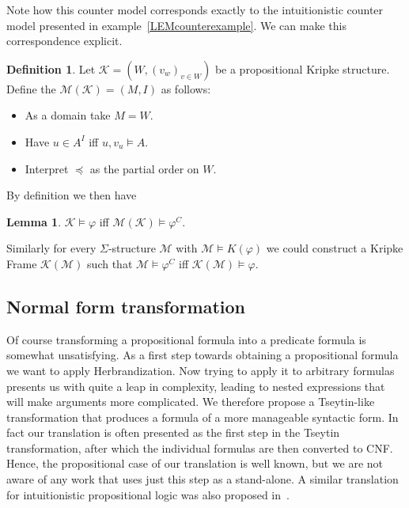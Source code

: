 \documentclass[a4paper,11pt]{report}
\theoremstyle{definition}
\theoremstyle{definition}
\theoremstyle{definition}
\newtheorem{lemma}[theorem]{Lemma}
\theoremstyle{definition}
\theoremstyle{definition}
\newtheorem{definition}[theorem]{Definition}
\theoremstyle{definition}
\theoremstyle{definition}
\begin{document}
	Note how this counter model corresponds exactly to the intuitionistic counter model presented in example~\ref{LEMcounterexample}. We can make this correspondence explicit.
	
	\begin{definition}
		Let $\mathcal K = (W, (v_w)_{v\in W})$ be a propositional Kripke structure. Define the $\mathcal M(\mathcal K) = (M, I)$ as follows:
		\begin{itemize}
			\item As a domain take $M = W$.
			\item Have $u\in A^{I}$ iff $u, v_u\models A$.
			\item Interpret $\preceq$ as the partial order on $W$.
		\end{itemize}
	\end{definition}

	\noindent By definition we then have
	\begin{lemma}
		$\mathcal K\models \varphi$ iff $\mathcal M(\mathcal K)\models \varphi^{C}$.
	\end{lemma}
	
	\indent Similarly for every $\Sigma$-structure $\mathcal M$ with $\mathcal M\models K(\varphi)$ we could construct a Kripke Frame $\mathcal K(\mathcal M)$ such that $\mathcal M\models \varphi^C$ iff $\mathcal K(\mathcal M)\models \varphi$.
	
	\subsection{Normal form transformation}\label{section:tseytin}
	
	Of course transforming a propositional formula into a predicate formula is somewhat unsatisfying. As a first step towards obtaining a propositional formula we want to apply Herbrandization. Now trying to apply it to arbitrary formulas presents us with quite a leap in complexity, leading to nested expressions that will make arguments more complicated. We therefore propose a Tseytin-like transformation that produces a formula of a more manageable syntactic form. In fact our translation is often presented as the first step in the Tseytin transformation, after which the individual formulas are then converted to CNF.
	Hence, the propositional case of our translation is well known, but we are not aware of any work that uses just this step as a stand-alone. A similar translation for intuitionistic propositional logic was also proposed in~\cite{statman1979intuitionistic}.
	
\end{document}
